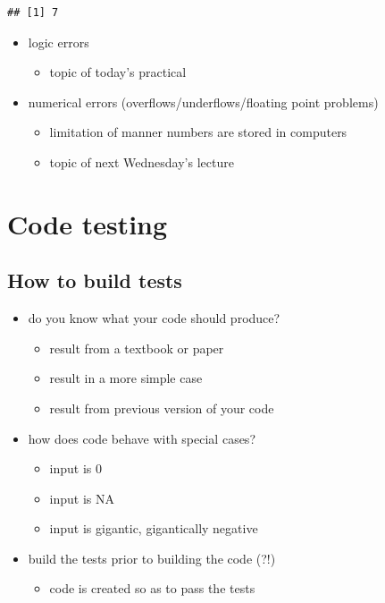 \documentclass[]{article}
\providecommand{\tightlist}{%
  \setlength{\itemsep}{0pt}\setlength{\parskip}{0pt}}
\begin{document}
\begin{verbatim}
## [1] 7
\end{verbatim}

\begin{itemize}
\tightlist
\item
  logic errors

  \begin{itemize}
  \tightlist
  \item
    topic of today's practical
  \end{itemize}
\item
  numerical errors (overflows/underflows/floating point problems)

  \begin{itemize}
  \tightlist
  \item
    limitation of manner numbers are stored in computers
  \item
    topic of next Wednesday's lecture
  \end{itemize}
\end{itemize}

\section{Code testing}\label{code-testing}

\subsection{How to build tests}\label{how-to-build-tests}

\begin{itemize}
\tightlist
\item
  do you know what your code should produce?

  \begin{itemize}
  \tightlist
  \item
    result from a textbook or paper
  \item
    result in a more simple case
  \item
    result from previous version of your code
  \end{itemize}
\item
  how does code behave with special cases?

  \begin{itemize}
  \tightlist
  \item
    input is 0
  \item
    input is NA
  \item
    input is gigantic, gigantically negative
  \end{itemize}
\item
  build the tests prior to building the code (?!)

  \begin{itemize}
  \tightlist
  \item
    code is created so as to pass the tests
  \end{itemize}
\end{itemize}
\end{document}
